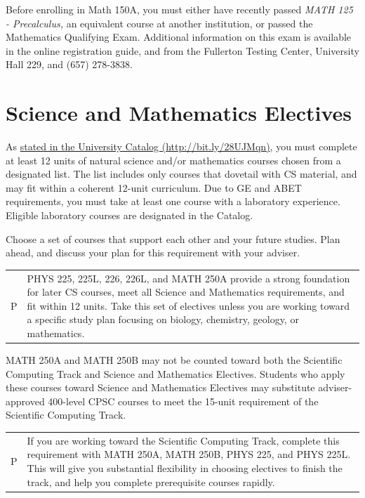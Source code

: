 \documentclass{book}
\newenvironment{tip}{
  \tcolorbox \begin{tabular}{m{.5in} m{5in}} \Large{P} &
}{
  \end{tabular} \endtcolorbox
}
\begin{document}
Before enrolling in Math 150A, you must either have recently passed \emph{MATH 125 - Precalculus,} an equivalent course at another institution, or passed the Mathematics Qualifying Exam. Additional information on this exam is available in the online registration guide, and from the Fullerton Testing Center, University Hall 229, and (657) 278-3838.

\section{Science and Mathematics Electives}

As \href{http://catalog.fullerton.edu/preview_program.php?catoid=2&poid=537&returnto=137}{stated in the University Catalog (\url{http://bit.ly/28UJMqn})}, you must complete at least 12 units of natural science and/or mathematics courses chosen from a designated list. The list includes only courses that dovetail with CS material, and may fit within a coherent 12-unit curriculum. Due to GE and ABET requirements, you must take at least one course with a laboratory experience. Eligible laboratory courses are designated in the Catalog.

Choose a set of courses that support each other and your future studies. Plan ahead, and discuss your plan for this requirement with your adviser.

\begin{tip}
PHYS 225, 225L, 226, 226L, and MATH 250A provide a strong foundation for later CS courses, meet all Science and Mathematics requirements, and fit within 12 units. Take this set of electives unless you are working toward a specific study plan focusing on biology, chemistry, geology, or mathematics.
\end{tip}

MATH 250A and MATH 250B may not be counted toward both the Scientific Computing Track \ScTrackIndex and Science and Mathematics Electives. Students who apply these courses toward Science and Mathematics Electives may substitute adviser-approved 400-level CPSC courses to meet the 15-unit requirement of the Scientific Computing Track.

\begin{tip}
If you are working toward the Scientific Computing Track, complete this requirement with  MATH 250A, MATH 250B, PHYS 225, and PHYS 225L. This will give you substantial flexibility in choosing electives to finish the track, and help you complete prerequisite courses rapidly.
\end{tip}
\end{document}
